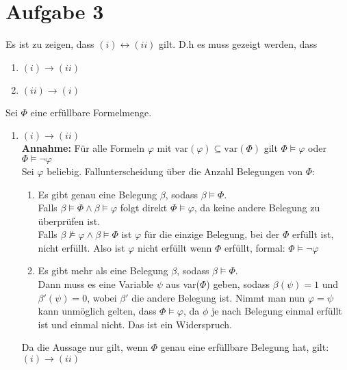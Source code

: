 \documentclass[a4paper,10pt]{article}
\begin{document}
\section*{Aufgabe 3}
Es ist zu zeigen, dass \((i) \leftrightarrow (ii) \) gilt. D.h es muss gezeigt werden, dass
 	\begin{enumerate}
 		\item 	\( (i) \rightarrow (ii) \)
 		\item 	\( (ii) \rightarrow (i)\)
 	\end{enumerate}
 	Sei $\Phi$ eine erfüllbare Formelmenge.
 	\begin{enumerate}
 		\item 	\( (i) \rightarrow (ii)\) \\
 			\textbf{Annahme: } Für alle Formeln \(\varphi\) mit \( \text{var}(\varphi)  \subseteq \text{var}(\Phi)\) gilt \(\Phi \vDash \varphi  \) oder \(\Phi \vDash \lnot \varphi\) \\
 			Sei $\varphi$ beliebig. Fallunterscheidung über die Anzahl Belegungen von $\Phi$:
 			\begin{enumerate}
 				\item 	Es gibt genau eine Belegung $\beta$, sodass $\beta \vDash \Phi$. \\
 					Falls $\beta \vDash \Phi \land \beta \vDash \varphi$ folgt direkt \(\Phi \vDash \varphi  \), da keine andere Belegung zu überprüfen ist. \\
 					Falls $\beta \not \vDash \varphi \land \beta \vDash \Phi$ ist $\varphi$ für die einzige Belegung, bei der $\Phi$ erfüllt ist, nicht erfüllt. Also ist $\varphi$ nicht erfüllt wenn $\Phi$ erfüllt, formal: \(\Phi \vDash \lnot \varphi  \)
 				\item 	Es gibt mehr als eine Belegung $\beta$, sodass $\beta \vDash \Phi$. \\
 					Dann muss es eine Variable $\psi$ aus var($\Phi$) geben, sodass $\beta(\psi) = 1$ und $\beta'(\psi) = 0$, wobei $\beta'$ die andere Belegung ist. Nimmt man nun $\varphi = \psi$ kann unmöglich gelten, dass $\Phi \vDash \varphi$, da $\phi$ je nach Belegung einmal erfüllt ist und einmal nicht. Das ist ein Widerspruch.		
 			\end{enumerate}
 			Da die Aussage nur gilt, wenn $\Phi$ genau eine erfüllbare Belegung hat, gilt: $(i) \rightarrow (ii)$

\end{enumerate}
\end{document}

